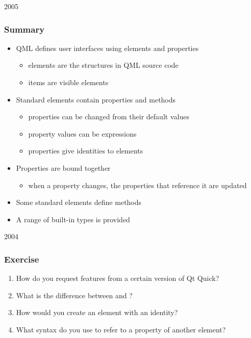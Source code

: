 \begin{slide}{2005}\frametitle{Summary}

\begin{itemize}
\item QML defines user interfaces using elements and properties
  \begin{itemize}
  \item elements are the structures in QML source code
  \item items are visible elements
  \end{itemize}
\item Standard elements contain properties and methods
  \begin{itemize}
  \item properties can be changed from their default values
  \item property values can be expressions
  \item {} properties give identities to elements
  \end{itemize}
\item Properties are bound together
  \begin{itemize}
  \item when a property changes, the properties that reference it are updated
  \end{itemize}
\item Some standard elements define methods
\item A range of built-in types is provided
\end{itemize}


\end{slide}

                                   

\begin{slide}{2004}\frametitle{Exercise}

\begin{enumerate}
\item How do you request features from a certain version of Qt Quick?
\item What is the difference between  and ?
\item How would you create an element with an identity?
\item What syntax do you use to refer to a property of another element?
\end{enumerate}

\end{slide}

